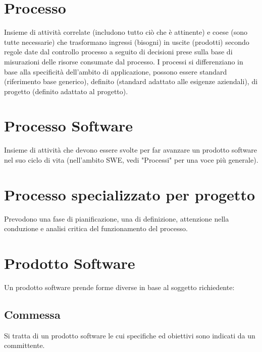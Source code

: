 	\section{Processo}	
	\label{sec:processi}
	Insieme di attività correlate (includono tutto ciò che è attinente) e coese (sono tutte necessarie) che trasformano ingressi (bisogni) in uscite (prodotti) secondo regole date dal controllo processo a seguito di decisioni prese sulla base di misurazioni delle risorse consumate dal processo.
	I processi si differenziano in base alla specificità dell'ambito di applicazione, possono essere standard (riferimento base generico), definito (standard adattato alle esigenze aziendali), di progetto (definito adattato al progetto).
	
	\section{Processo Software}
	\label{sec:processisoftware}
Insieme di attività che devono essere svolte per far avanzare un prodotto software nel suo ciclo di vita (nell'ambito SWE, vedi "Processi" per una voce più generale).

	\section{Processo specializzato per progetto}
	\label{sec:processispecializzati}
	Prevodono una fase di pianificazione, una di definizione, attenzione nella conduzione e analisi critica del funzionamento del processo.
	
	\section{Prodotto Software}
	\label{sec:prodottosoftware}
	Un prodotto software prende forme diverse in base al soggetto richiedente:
		
		\subsection{Commessa}
		Si tratta di un prodotto software le cui specifiche ed obiettivi sono indicati da un committente.
	

